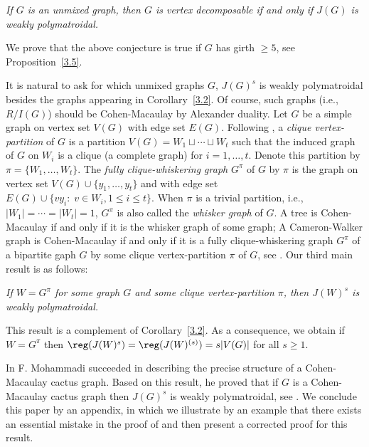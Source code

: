 \documentclass[12pt]{amsart}
\let\:=\colon
\begin{document}
 \vspace{1.5mm}
    {\it If $G$ is an unmixed graph, then $G$ is vertex decomposable if and only if $J(G)$ is weakly polymatroidal.}
   \vspace{1mm}


  We  prove that  the above conjecture is true if $G$ has girth $\geq 5$, see Proposition~\ref{3.5}.
\vspace{0.1mm}

  It is natural to ask  for which unmixed graphs $G$,  $J(G)^{s}$  is  weakly polymatroidal  besides the graphs appearing in Corollary~\ref{3.2}. Of course, such  graphs (i.e., $R/I(G)$) should be Cohen-Macaulay by Alexander duality.     Let $G$ be a simple graph on vertex set $V(G)$ with edge set $E(G)$. Following \cite{CN}, a {\it clique vertex-partition} of $G$ is a partition $V(G)=W_1\sqcup \cdots \sqcup W_t$ such that the induced graph of $G$ on $W_i$ is a clique (a complete graph) for $i=1,\ldots,t$.   Denote this partition by $\pi=\{W_1, \ldots,W_t\}$. The {\it fully clique-whiskering graph} $G^{\pi}$ of $G$ by $\pi$  is the graph   on  vertex set $V(G)\cup\{y_1,\ldots, y_t\}$ and with edge set $E(G)\cup\{vy_i \:\; v\in W_i, 1\leq i\leq t\}$. When $\pi$ is a trivial partition, i.e., $|W_1|=\cdots=|W_t|=1$, $G^{\pi}$ is also called the {\it whisker graph} of $G$. A tree is Cohen-Macaulay if and only if it is the whisker graph of some graph;  A Cameron-Walker graph is  Cohen-Macaulay if and only if it is a fully clique-whiskering graph $G^{\pi}$ of a bipartite gaph $G$ by some clique vertex-partition $\pi$ of $G$,  see \cite[Theorem 1.3]{HHKO}. Our third main result is as follows:



 \vspace{1mm}
  {\it If $W=G^{\pi}$ for some graph $G$ and some clique vertex-partition $\pi$, then   $J(W)^s$ is weakly polymatroidal.}
  \vspace{1mm}

 This result is a complement of Corollary~\ref{3.2}.   As a consequence, we obtain if $W=G^{\pi}$  then $\reg(J(W)^s)=\reg(J(W)^{(s)})=s|V(G)|$ for all $s\geq 1$.
 \vspace{1mm}

In \cite{M}  F. Mohammadi succeeded in describing  the precise structure of a Cohen-Macaulay cactus graph.  Based on this result, he proved that if $G$ is a Cohen-Macaulay  cactus graph then  $J(G)^s$ is weakly polymatroidal, see \cite[Theorem 4.3]{M}.
  We conclude this paper by an appendix, in which we  illustrate by an example that there exists an essential mistake in the proof of \cite[Theorem 4.3]{M} and then present a corrected proof for this result.
\vspace{1mm}
\end{document}
